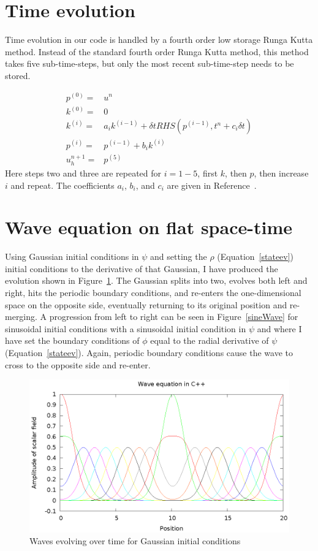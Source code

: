 \section{Time evolution}

Time evolution in our code is handled by a fourth order low storage Runga Kutta method. Instead of the standard fourth order Runga Kutta method, this method takes five sub-time-steps, but only the most recent sub-time-step needs to be stored.

\begin{eqnarray}
  p^{(0)}=&u^n\nonumber\\
  k^{(0)}=&0\nonumber\\
  k^{(i)}=&a_ik^{(i-1)}+\delta t RHS(p^{(i-1)},t^n+c_i\delta t)\nonumber\\
  p^{(i)}=&p^{(i-1)}+b_ik^{(i)}\nonumber\\
  u_h^{n+1}=&p^{(5)}
\end{eqnarray}
Here steps two and three are repeated for $i=1-5$, first $k$, then $p$, then increase $i$ and repeat. The coefficients $a_i$, $b_i$, and $c_i$ are given in Reference~\cite{dghesthaven}.

\section{Wave equation on flat space-time}

Using Gaussian initial conditions in $\psi$ and setting the $\rho$ (Equation~\ref{stateev}) initial conditions to the derivative of that Gaussian, I have produced the evolution shown in Figure~\ref{gaussWave}. The Gaussian splits into two, evolves both left and right, hits the periodic boundary conditions, and re-enters the one-dimensional space on the opposite side, eventually returning to its original position and re-merging. A progression from left to right can be seen in Figure~\ref{sineWave} for sinusoidal initial conditions with a sinusoidal initial condition in $\psi$ and where I have set the boundary conditions of $\phi$ equal to the radial derivative of $\psi$ (Equation~\ref{stateev}). Again, periodic boundary conditions cause the wave to cross to the opposite side and re-enter.

\begin{figure}
  \includegraphics{gaussWave}
  \caption{Waves evolving over time for Gaussian initial conditions}
  \label{gaussWave}
\end{figure}

